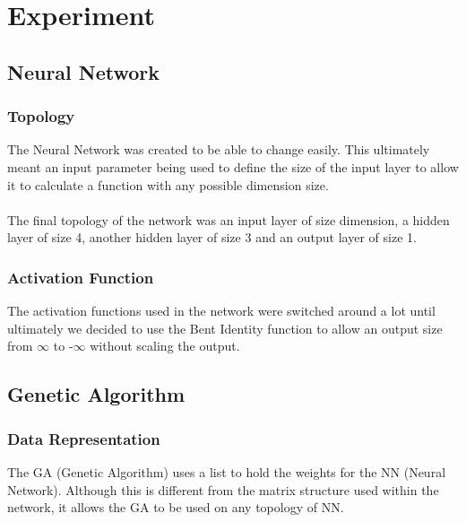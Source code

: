 \documentclass[12pt]{article}
\begin{document}
\newpage
\section{Experiment}
\subsection{Neural Network}
\subsubsection{Topology}
The Neural Network was created to be able to change easily. This ultimately meant an input parameter being used to define the size of the input layer to allow it to calculate a function with any possible dimension size.\\\\
The final topology of the network was an input layer of size dimension, a hidden layer of size 4, another hidden layer of size 3 and an output layer of size 1.

\subsubsection{Activation Function}
The activation functions used in the network were switched around a lot until ultimately we decided to use the Bent Identity function to allow an output size from $\infty$ to -$\infty$ without scaling the output. 

\subsection{Genetic Algorithm}
\subsubsection{Data Representation}
The GA (Genetic Algorithm) uses a list to hold the weights for the NN (Neural Network). Although this is different from the matrix structure used within the network, it allows the GA to be used on any topology of NN. 
\end{document}
